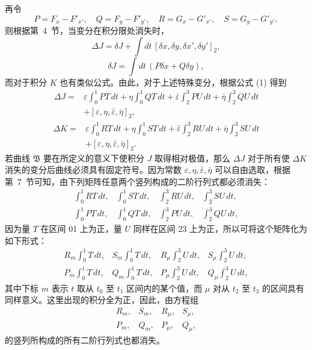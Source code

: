 \documentclass[11pt,a4paper,leqno]{article}
\begin{document}
再令
\[
P=F_x-F'_{x'},\quad Q=F_y-F'_{y'},\quad
R=G_x-G'_{x'},\quad S=G_y-G'_{y'},
\]
则根据第~4~节，当变分在积分限处消失时，
\[
\Delta J=\delta J+\int dt\,[\delta x,\delta y,\delta x',\delta y']_2,
\]
\[
\delta J=\int dt\,(P\delta x+Q\delta y),
\]
而对于积分 $K$ 也有类似公式。由此，对于上述特殊变分，根据公式 (1) 得到
\[
\begin{aligned}
\Delta J={}&\varepsilon\int_0^1PT\,dt+
\eta\int_0^1QT\,dt+
\bar\varepsilon\int_2^3PU\,dt+
\bar\eta\int_2^3QU\,dt\\
&+[\varepsilon,\eta,\bar\varepsilon,\bar\eta]_2,
\end{aligned}
\]
\[
\begin{aligned}
\Delta K={}&\varepsilon\int_0^1RT\,dt+
\eta\int_0^1ST\,dt+
\bar\varepsilon\int_2^3RU\,dt+
\bar\eta\int_2^3SU\,dt\\
&+[\varepsilon,\eta,\bar\varepsilon,\bar\eta]_2.
\end{aligned}
\]
若曲线 $\mathfrak{B}$ 要在所定义的意义下使积分 $J$ 取得相对极值，那么 $\Delta J$ 对于所有使 $\Delta K$ 消失的变分后曲线必须具有固定符号。因为常数 $\varepsilon,\eta,\bar\varepsilon,\bar\eta$ 可以自由选取，根据第~7~节可知，由下列矩阵任意两个竖列构成的二阶行列式都必须消失：
\[
\begin{array}{cccc}
\displaystyle \int_0^1RT\,dt,&\displaystyle \int_0^1ST\,dt,&\displaystyle \int_2^3RU\,dt,&\displaystyle \int_2^3SU\,dt,\\[2.2ex]
\displaystyle \int_0^1PT\,dt,&\displaystyle \int_0^1QT\,dt,&\displaystyle \int_2^3PU\,dt,&\displaystyle \int_2^3QU\,dt,
\end{array}
\]
因为量 $T$ 在区间 01 上为正，量 $U$ 同样在区间 23 上为正，所以可将这个矩阵化为如下形式：
\[
\begin{array}{cccc}
\displaystyle R_m\int_0^1T\,dt,&\displaystyle S_m\int_0^1T\,dt,&\displaystyle R_\mu\int_2^3U\,dt,&\displaystyle S_\mu\int_2^3U\,dt,\\[2.2ex]
\displaystyle P_m\int_0^1T\,dt,&\displaystyle Q_m\int_0^1T\,dt,&\displaystyle P_\mu\int_2^3U\,dt,&\displaystyle Q_\mu\int_2^3U\,dt,
\end{array}
\]
其中下标 $m$ 表示 $t$ 取从 $t_0$ 至 $t_1$ 区间内的某个值，而 $\mu$ 对从 $t_2$ 至 $t_3$ 的区间具有同样意义。这里出现的积分全为正，因此，由方程组
\begin{equation}\tag{2}
\begin{array}{cccc}
R_m,&S_m,&R_\mu,&S_\mu,\\
P_m,&Q_m,&P_\mu,&Q_\mu,
\end{array}
\end{equation}
的竖列所构成的所有二阶行列式也都消失。
\end{document}
